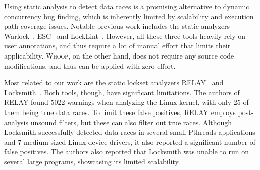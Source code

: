 Using static analysis to detect data races is a promising alternative to dynamic concurrency bug finding, which is inherently limited by scalability and execution path coverage issues. Notable previous work includes the static analyzers Warlock~\cite{sterling1993warlock}, ESC~\cite{detlefs1998extended} and LockLint~\cite{oracle2010locklint}. However, all these three tools heavily rely on user annotations, and thus require a lot of manual effort that limits their applicability. \textsc{Whoop}, on the other hand, does not require any source code modifications, and thus can be applied with zero effort.

Most related to our work are the static lockset analyzers RELAY~\cite{voung2007relay} and Locksmith~\cite{pratikakis2006locksmith}. Both tools, though, have significant limitations. The authors of RELAY found 5022 warnings when analyzing the Linux kernel, with only 25 of them being true data races. To limit these false positives, RELAY employs post-analysis unsound filters, but these can also filter out true races. Although Locksmith successfully detected data races in several small Pthreads applications and 7 medium-sized Linux device drivers, it also reported a significant number of false positives. The authors also reported that Locksmith was unable to run on several large programs, showcasing its limited scalability.